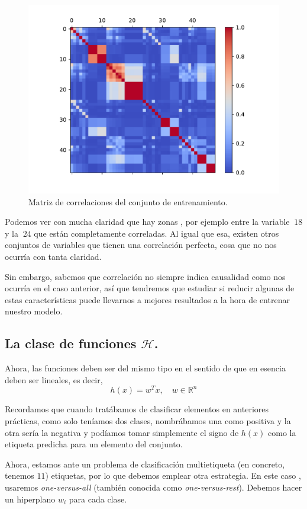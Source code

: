 \documentclass[a4paper, 20pt]{article}
\newcommand{\R}{\mathbb R}
\begin{document}
\begin{figure}[H]
  \centering
  \includegraphics[width=0.55\linewidth]{media/corr-standarized-classification.pdf}
  \caption{Matriz de correlaciones del conjunto de entrenamiento. }
  \label{fig:class-numbers}
\end{figure}

Podemos ver con mucha claridad que hay zonas , por ejemplo entre la variable $~18$ y la $~24$ que están completamente correladas. Al igual que esa, existen otros conjuntos de variables que tienen una correlación perfecta, cosa que no nos ocurría con tanta claridad.

Sin embargo, sabemos que correlación no siempre indica causalidad como nos ocurría en el caso anterior, así que tendremos que estudiar si reducir algunas de estas características puede llevarnos a mejores resultados a la hora de entrenar nuestro modelo.


\subsection{La clase de funciones $\mathcal H$.}


Ahora, las funciones deben ser del mismo tipo en el sentido de que en esencia deben ser lineales, es decir,
$$
h(x) = w^T x, \quad w \in \R^n
$$

Recordamos que cuando tratábamos de clasificar elementos en anteriores prácticas, como solo teníamos dos clases, nombrábamos una como positiva y la otra sería la negativa y podíamos tomar simplemente el signo de $h(x)$ como la etiqueta predicha para un elemento del conjunto. 

Ahora, estamos ante un problema de clasificación multietiqueta (en concreto, tenemos $11$) etiquetas, por lo que debemos emplear otra estrategia. En este caso , usaremos \emph{one-versus-all} (también conocida como \emph{one-versus-rest}). Debemos hacer un hiperplano $w_i$ para cada clase. 
\end{document}
